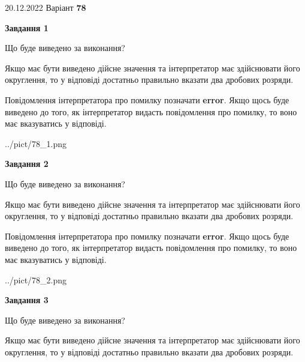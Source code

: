 \documentclass[12pt, ukrainian]{article}
\begin{document}
{20.12.2022 Варіант \No \textbf { 78 }\par}
{
\begin {Large}

{\begin {center}\textbf{Завдання 1}\end {center}}\par
Що буде виведено за виконання? \par

Якщо має бути виведено дійсне значення та інтерпретатор має здійснювати його округлення, 
то у відповіді достатньо правильно вказати два дробових розряди.

Повідомлення інтерпретатора про помилку позначати \textbf{error}.
Якщо щось буде виведено до того, як інтерпретатор видасть повідомлення про помилку, 
то воно має вказуватись у відповіді. \par

\begin{center}
	{../pict/78_1.png}
\end{center}
\newpage

{\begin {center}\textbf{Завдання 2}\end {center}}\par
Що буде виведено за виконання? \par

Якщо має бути виведено дійсне значення та інтерпретатор має здійснювати його округлення, 
то у відповіді достатньо правильно вказати два дробових розряди.

Повідомлення інтерпретатора про помилку позначати \textbf{error}.
Якщо щось буде виведено до того, як інтерпретатор видасть повідомлення про помилку, 
то воно має вказуватись у відповіді. \par

\begin{center}
	{../pict/78_2.png}
\end{center}
\newpage

{\begin {center}\textbf{Завдання 3}\end {center}}\par
Що буде виведено за виконання? \par

Якщо має бути виведено дійсне значення та інтерпретатор має здійснювати його округлення, 
то у відповіді достатньо правильно вказати два дробових розряди.


\end{Large}}
\end{document}
